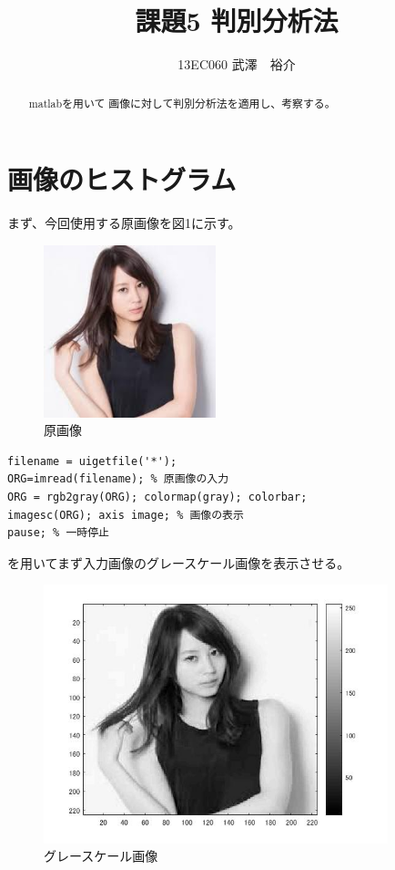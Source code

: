 \documentclass{jsarticle}
\begin{document}
\title{課題5 判別分析法}
\author{13EC060 武澤　裕介}
\maketitle
\begin{abstract}
matlabを用いて	画像に対して判別分析法を適用し、考察する。
\end{abstract}
\section{画像のヒストグラム}
まず、今回使用する原画像を図1に示す。


\begin{figure}[htbp]
 \begin{center}
  \includegraphics[width=5cm,height=5cm]{index.jpg}
 \end{center}
 \caption{原画像}
\end{figure}

\begin{lstlisting}[basicstyle=\ttfamily\footnotesize, frame=single]
filename = uigetfile('*');
ORG=imread(filename); % 原画像の入力
ORG = rgb2gray(ORG); colormap(gray); colorbar;
imagesc(ORG); axis image; % 画像の表示
pause; % 一時停止
 \end{lstlisting}
を用いてまず入力画像のグレースケール画像を表示させる。

\newpage
\begin{figure}[htbp]
 \begin{center}
  \includegraphics[width=10cm]{kadai5-0.jpg}
 \end{center}
 \caption{グレースケール画像}
\end{figure}
\end{document}

